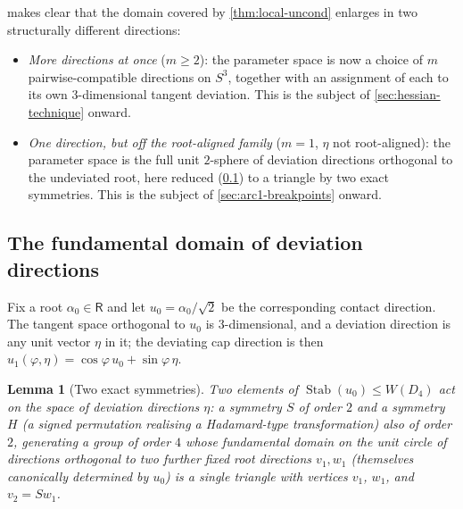 \documentclass[11pt,reqno]{amsart}
\renewcommand{\_}{\origunderscore\allowbreak}
\numberwithin{equation}{section}
\theoremstyle{plain}
\newtheorem{lem}[thm]{Lemma}
\theoremstyle{definition}
\theoremstyle{remark}
\newcommand{\Rt}{\mathsf{R}}                 %
\newcommand{\tilt}{\varphi}                  %
\newcommand{\dev}{\eta}                      %
\DeclareMathOperator{\Stab}{Stab}
\begin{document}
 makes clear that the domain covered by
\cref{thm:local-uncond} enlarges in two structurally different
directions:

\begin{itemize}[leftmargin=1.6em]
\item \emph{More directions at once} ($m\ge2$): the parameter space is
now a choice of $m$ pairwise-compatible directions on $S^3$, together
with an assignment of each to its own $3$-dimensional tangent
deviation. This is the subject of \cref{sec:hessian-technique} onward.
\item \emph{One direction, but off the root-aligned family}
($m=1$, $\dev$ not root-aligned): the parameter space is the full unit
$2$-sphere of deviation directions orthogonal to the undeviated root,
here reduced (\cref{sec:fundamental-domain-new}) to a triangle by two
exact symmetries. This is the subject of
\cref{sec:arc1-breakpoints} onward.
\end{itemize}

\subsection{The fundamental domain of deviation directions}\label{sec:fundamental-domain-new}

Fix a root $\alpha_0\in\Rt$ and let $u_0=\alpha_0/\sqrt2$ be the
corresponding contact direction. The tangent space orthogonal to $u_0$
is $3$-dimensional, and a deviation direction is any unit vector
$\dev$ in it; the deviating cap direction is then
$u_1(\tilt,\dev)=\cos\tilt\,u_0+\sin\tilt\,\dev$.

\begin{lem}[Two exact symmetries]\label{lem:two-symmetries-new}
Two elements of $\Stab(u_0)\le W(D_4)$ act on the space of deviation
directions $\dev$: a symmetry $S$ of order $2$ and a symmetry $H$
(a signed permutation realising a Hadamard-type transformation) also of
order $2$, generating a group of order $4$ whose fundamental domain on
the unit circle of directions orthogonal to two further fixed root
directions $v_1,w_1$ (themselves canonically determined by $u_0$) is a
single triangle with vertices $v_1$, $w_1$, and $v_2=Sw_1$.
\end{lem}
\end{document}
